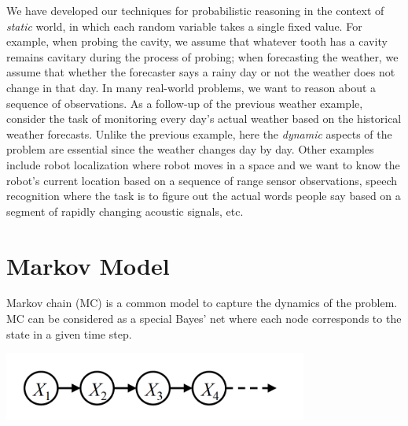 \documentclass[11pt,fleqn]{article}
\def\title{Note \the\lecturenumber}
\begin{document}
\maketitle

We have developed our techniques for probabilistic reasoning in the context of \textit{static} world, in which each random variable takes a single fixed value. For example, when probing the cavity, we assume that whatever tooth has a cavity remains cavitary during the process of probing; when forecasting the weather, we assume that whether the forecaster says a rainy day or not the weather does not change in that day. In many real-world problems, we want to reason about a sequence of observations. As a follow-up of the previous weather example, consider the task of monitoring every day's actual weather based on the historical weather forecasts. Unlike the previous example, here the \textit{dynamic} aspects of the problem are essential since the weather changes day by day. Other examples include robot localization where robot moves in a space and we want to know the robot's current location based on a sequence of range sensor observations, speech recognition where the task is to figure out the actual words people say based on a segment of rapidly changing acoustic signals, etc. 

\section{Markov Model}
Markov chain (MC) is a common model to capture the dynamics of the problem. MC can be considered as a special Bayes' net where each node corresponds to the state in a given time step.

\begin{center}	
	\includegraphics[width=10cm]{img/mc}
\end{center} 


\end{document}
\end{document}
